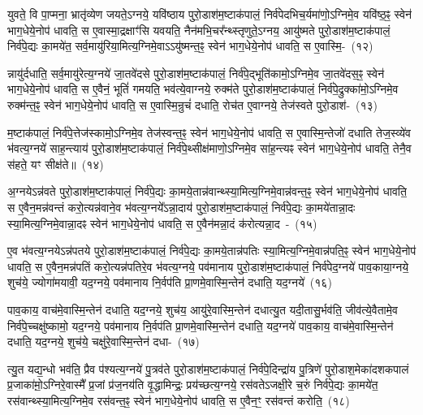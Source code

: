युवते॒ वि पा॒प्मना॒ भ्रातृ॑व्येण जयते॒\-ऽग्नये॒ यवि॑ष्ठाय पुरो॒डाश॑\-म॒ष्टा\-क॑पालं॒ निर्व॑पेदभिच॒र्यमा॑णो॒\-ऽग्निमे॒व यवि॑ष्ठ॒ꣴ॒ स्वेन॑ भाग॒धेये॒नोप॑ धावति॒ स ए॒वास्मा॒द्रक्षाꣳ॑सि यवयति॒ नैन॑मभि॒चर᳚न्थ्स्तृणुते॒\-ऽग्नय॒ आयु॑ष्मते पुरो॒डाश॑\-म॒ष्टा\-क॑पालं॒ निर्व॑पे॒द्यः का॒मये॑त॒ सर्व॒मायु॑रिया॒मित्य॒ग्निमे॒वा\-ऽऽ\-यु॑ष्मन्त॒ꣴ॒ स्वेन॑ भाग॒धेये॒नोप॑ धावति॒ स ए॒वास्मि॒-~(१२)

न्नायु॑र्दधाति॒ सर्व॒मायु॑रेत्य॒ग्नये॑ जा॒तवे॑दसे पुरो॒डाश॑\-म॒ष्टा\-क॑पालं॒ निर्व॑पे॒द्भूति॑कामो॒\-ऽग्निमे॒व जा॒तवे॑दस॒ꣴ॒ स्वेन॑ भाग॒धेये॒नोप॑ धावति॒ स ए॒वैनं॒ भूतिं॑ गमयति॒ भव॑त्ये॒वाग्नये॒ रुक्म॑ते पुरो॒डाश॑\-म॒ष्टा\-क॑पालं॒ निर्व॑पे॒द्रुक्का॑मो॒\-ऽग्निमे॒व रुक्म॑न्त॒ꣴ॒ स्वेन॑ भाग॒धेये॒नोप॑ धावति॒ स ए॒वास्मि॒न्रुचं॑ दधाति॒ रोच॑त ए॒वाग्नये॒ तेज॑स्वते पुरो॒डाश॑-~(१३)

म॒ष्टा\-क॑पालं॒ निर्व॑पे॒त्तेज॑स्कामो॒\-ऽग्निमे॒व तेज॑स्वन्त॒ꣴ॒ स्वेन॑ भाग॒धेये॒नोप॑ धावति॒ स ए॒वास्मि॒न्तेजो॑ दधाति तेज॒स्व्ये॑व भ॑वत्य॒ग्नये॑ साह॒न्त्याय॑ पुरो॒डाश॑\-म॒ष्टा\-क॑पालं॒ निर्व॑पे॒थ्सीक्ष॑माणो॒\-ऽग्निमे॒व सा॑ह॒न्त्यꣴ स्वेन॑ भाग॒धेये॒नोप॑ धावति॒ तेनै॒व स॑हते॒ यꣳ सीक्ष॑ते॥~(१४)

{\anuvakamend[{भ्रातृ॑व्यस्यास्मि॒न्तेज॑स्वते पुरो॒डाश॑\-म॒ष्टात्रिꣳ॑शच्च}]}%

अ॒ग्नये\-ऽन्न॑वते पुरो॒डाश॑\-म॒ष्टा\-क॑पालं॒ निर्व॑पे॒द्यः का॒मये॒तान्न॑\-वान्थ्स्या॒मित्य॒ग्नि\-मे॒वान्न॑वन्त॒ꣴ॒ स्वेन॑ भाग॒धेये॒नोप॑ धावति॒ स ए॒वैन॒मन्न॑वन्तं करो॒त्यन्न॑वाने॒व भ॑वत्य॒ग्नये᳚\-ऽन्ना॒दाय॑ पुरो॒डाश॑\-म॒ष्टाक॑पालं॒ निर्व॑पे॒द्यः का॒मये॑तान्ना॒दः स्या॒मित्य॒ग्निमे॒वान्ना॒दꣴ स्वेन॑ भाग॒धेये॒नोप॑ धावति॒ स ए॒वैन॑मन्ना॒दं क॑रोत्यन्ना॒द~-~(१५)

ए॒व भ॑वत्य॒ग्नये\-ऽन्न॑पतये पुरो॒डाश॑\-म॒ष्टा\-क॑पालं॒ निर्व॑पे॒द्यः का॒मये॒तान्न॑पतिः स्या॒मित्य॒ग्निमे॒वान्न॑पति॒ꣴ॒ स्वेन॑ भाग॒धेये॒नोप॑ धावति॒ स ए॒वैन॒मन्न॑पतिं करो॒त्यन्न॑पतिरे॒व भ॑वत्य॒ग्नये॒ पव॑मानाय पुरो॒डाश॑\-म॒ष्टा\-क॑पालं॒ निर्व॑पेद॒ग्नये॑ पाव॒काया॒ग्नये॒ शुच॑ये॒ ज्योगा॑मयावी॒ यद॒ग्नये॒ पव॑मानाय नि॒र्वप॑ति प्रा॒णमे॒वास्मि॒न्तेन॑ दधाति॒ यद॒ग्नये॑~(१६)

पाव॒काय॒ वाच॑मे॒वास्मि॒न्तेन॑ दधाति॒ यद॒ग्नये॒ शुच॑य॒ आयु॑रे॒वास्मि॒न्तेन॑ दधात्यु॒त यदी॒तासु॒र्भव॑ति॒ जीव॑त्ये॒वैतामे॒व निर्व॑पे॒च्चक्षु॑ष्कामो॒ यद॒ग्नये॒ पव॑मानाय नि॒र्वप॑ति प्रा॒णमे॒वा\-स्मि॒न्तेन॑ दधाति॒ यद॒ग्नये॑ पाव॒काय॒ वाच॑मे॒वास्मि॒न्तेन॑ दधाति॒ यद॒ग्नये॒ शुच॑ये॒ चक्षु॑रे॒वास्मि॒न्तेन॑ दधा-~(१७)

त्यु॒त यद्य॒न्धो भव॑ति॒ प्रैव प॑श्यत्य॒ग्नये॑ पु॒त्रव॑ते पुरो॒डाश॑\-म॒ष्टा\-क॑पालं॒ निर्व॑पे॒दिन्द्रा॑य पु॒त्रिणे॑ पुरो॒डाश॒मेका॑\-दश\-कपालं प्र॒जाका॑मो़॒\-ऽग्निरे॒वास्मै᳚ प्र॒जां प्र॑ज॒नय॑ति वृ॒द्धामिन्द्रः॒ प्रय॑च्छत्य॒ग्नये॒ रस॑वते\-ऽजक्षी॒रे च॒रुं निर्व॑पे॒द्यः का॒मये॑त॒ रस॑वान्थ्स्या॒मित्य॒ग्निमे॒व रस॑वन्त॒ꣴ॒ स्वेन॑ भाग॒धेये॒नोप॑ धावति॒ स ए॒वैन॒ꣳ॒ रस॑वन्तं करोति॒~(१८)

